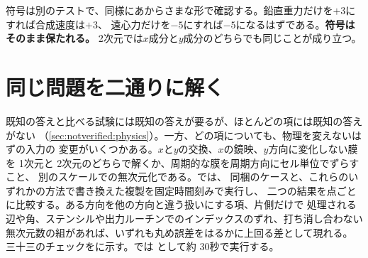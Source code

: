 符号は別のテストで、同様にあからさまな形で確認する。鉛直重力だけを$+3$にすれば合成速度は$+3$、
遠心力だけを$-5$にすれば$-5$になるはずである。\textbf{符号はそのまま保たれる。}
2次元では$x$成分と$y$成分のどちらでも同じことが成り立つ。

\section{同じ問題を二通りに解く}
\label{sec:verification:equivalence}

既知の答えと比べる試験には既知の答えが要るが、ほとんどの項には既知の答えがない
（\cref{sec:notverified:physics}）。一方、どの項についても、物理を変えないはずの入力の
変更がいくつかある。$x$と$y$の交換、$x$の鏡映、$y$方向に変化しない膜を 1次元と
2次元のどちらで解くか、周期的な膜を周期方向にセル単位でずらすこと、
別のスケールでの無次元化である。では、
同梱のケースと、これらのいずれかの方法で書き換えた複製を固定時間刻みで実行し、
二つの結果を点ごとに比較する。ある方向を他の方向と違う扱いにする項、片側だけで
処理される辺や角、ステンシルや出力ルーチンでのインデックスのずれ、打ち消し合わない
無次元数の組があれば、いずれも丸め誤差をはるかに上回る差として現れる。
三十三のチェックをに示す。では
として約 30秒で実行する。

